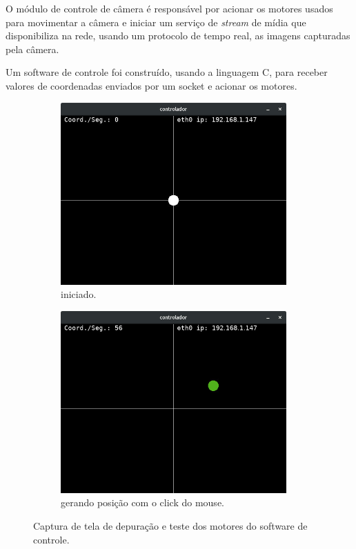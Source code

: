 O módulo de controle de câmera é responsável por acionar os motores usados para movimentar a câmera e iniciar um serviço de \textit{stream} de mídia que disponibiliza na rede, usando um protocolo de tempo real, as imagens capturadas pela câmera.\par
Um software de controle foi construído, usando a linguagem C, para receber valores de coordenadas enviados por um socket e acionar os motores.\par

\begin{figure}[H]
	\centering
	\begin{subfigure}{.5\textwidth}
		\includegraphics[width=0.95\textwidth]{figuras/controlador.jpg}
		\caption{iniciado.}
		\label{fig:controlador_teste}
	\end{subfigure}%
	\begin{subfigure}{.5\textwidth}
		\includegraphics[width=0.95\textwidth]{figuras/controlador2.jpg}
		\caption{gerando posição com o click do mouse.}
		\label{fig:controlador_teste_coordenada}
	\end{subfigure}
	\caption{Captura de tela de depuração e teste dos motores do software de controle.}
\end{figure}

